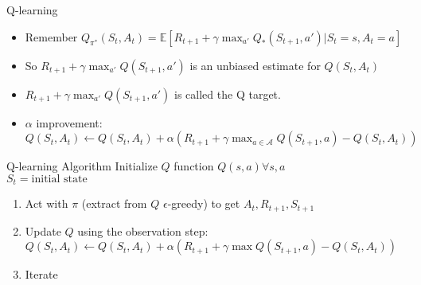 \documentclass{beamer}
\begin{document}
\begin{frame}{Q-learning}
\begin{itemize}
 \item Remember $Q_{\pi^*}(S_t,A_t) = \mathbb{E} [R_{t+1} + \gamma \max_{a'} Q_*(S_{t+1}, a') \vert S_t = s, A_t = a]$
 \item So $R_{t+1} + \gamma \max_{a'} Q(S_{t+1}, a')$ is an unbiased estimate for $Q(S_t, A_t)$
  \item $R_{t+1} + \gamma \max_{a'} Q(S_{t+1}, a')$ is called the Q target.
   \item $\alpha$ improvement:\\ $Q(S_t, A_t) \leftarrow Q(S_t, A_t) + \alpha (R_{t+1} + \gamma \max_{a \in \mathcal{A}} Q(S_{t+1}, a) - Q(S_t, A_t))$
\end{itemize}

\end{frame}
 
 \begin{frame}{Q-learning Algorithm}
Initialize $Q$ function $Q(s,a) \forall s,a$\\
$S_t=\text{initial state}$
\begin{enumerate}
\item Act with $\pi$ (extract from $Q$ $\epsilon$-greedy) to get $A_{t}, R_{t+1},S_{t+1}$
\item Update $Q$ using the observation step: $Q(S_t, A_t) \leftarrow Q(S_t, A_t) + \alpha (R_{t+1} + \gamma \max Q(S_{t+1}, a) - Q(S_t, A_t))$\\
\item Iterate
\end{enumerate}
\end{frame}
\end{document}
